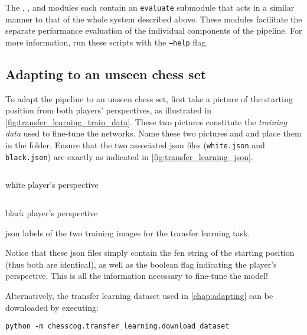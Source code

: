 \documentclass[../../report.tex]{subfiles}
\begin{document}
The , , and  modules each contain an \texttt{evaluate} submodule that acts in a similar manner to that of the whole system described above.
These modules facilitate the separate performance evaluation of the individual components of the pipeline.
For more information, run these scripts with the \texttt{--help} flag.

\subsection{Adapting to an unseen chess set}
To adapt the pipeline to an unseen chess set, first take a picture of the starting position from both players' perspectives, as illustrated in \cref{fig:transfer_learning_train_data}.
These two pictures constitute the \emph{training data} used to fine-tune the networks.
Name these two pictures  and  and place them in the  folder.
Ensure that the two associated \gls{json} files (\texttt{white.json} and \texttt{black.json}) are exactly as indicated in \cref{fig:transfer_learning_json}.
\begin{listing}
    \begin{sublisting}[b]{\textwidth}
        \inputminted{json}{\subfix{../../data/transfer_learning/white.json}}
        \caption{white player's perspective}
    \end{sublisting}
    \medskip\par
    \begin{sublisting}[b]{\textwidth}
        \inputminted{json}{\subfix{../../data/transfer_learning/black.json}}
        \caption{black player's perspective}
    \end{sublisting}
    \caption{\Acs{json} labels of the two training images for the transfer learning task.}
    \label{fig:transfer_learning_json}
\end{listing}
Notice that these \gls{json} files simply contain the \gls{fen} string of the starting position (thus both are identical), as well as the boolean flag indicating the player's perspective.
This is all the information necessary to fine-tune the model!

Alternatively, the transfer learning dataset used in \cref{chap:adapting} can be downloaded by executing:
\begin{verbatim}
python -m chesscog.transfer_learning.download_dataset
\end{verbatim}
\end{document}
